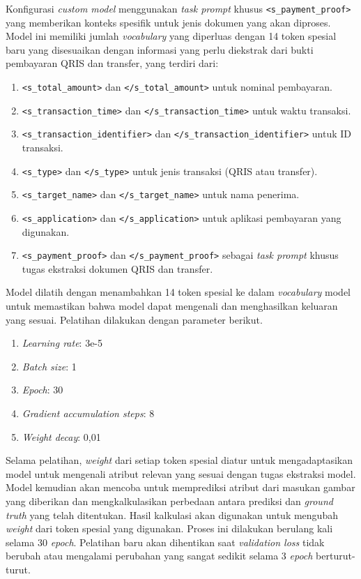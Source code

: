Konfigurasi \emph{custom model} menggunakan \emph{task prompt} khusus \texttt{<s\_payment\_proof>} yang memberikan konteks spesifik untuk jenis dokumen yang akan diproses. Model ini memiliki jumlah \emph{vocabulary} yang diperluas dengan 14 token spesial baru yang disesuaikan dengan informasi yang perlu diekstrak dari bukti pembayaran QRIS dan transfer, yang terdiri dari:
\begin{enumerate}
    \item \texttt{<s\_total\_amount>} dan \texttt{</s\_total\_amount>} untuk nominal pembayaran.
    \item \texttt{<s\_transaction\_time>} dan \texttt{</s\_transaction\_time>} untuk waktu transaksi.
    \item \texttt{<s\_transaction\_identifier>} dan \texttt{</s\_transaction\_identifier>} untuk ID transaksi.
    \item \texttt{<s\_type>} dan \texttt{</s\_type>} untuk jenis transaksi (QRIS atau transfer).
    \item \texttt{<s\_target\_name>} dan \texttt{</s\_target\_name>} untuk nama penerima.
    \item \texttt{<s\_application>} dan \texttt{</s\_application>} untuk aplikasi pembayaran yang digunakan.
    \item \texttt{<s\_payment\_proof>} dan \texttt{</s\_payment\_proof>} sebagai \emph{task prompt} khusus tugas ekstraksi dokumen QRIS dan transfer.
\end{enumerate}

Model dilatih dengan menambahkan 14 token spesial ke dalam \emph{vocabulary} model untuk memastikan bahwa model dapat mengenali dan menghasilkan keluaran yang sesuai. Pelatihan dilakukan dengan parameter berikut.
\begin{enumerate}
\item \emph{Learning rate}: 3e-5
\item \emph{Batch size}: 1
\item \emph{Epoch}: 30
\item \emph{Gradient accumulation steps}: 8
\item \emph{Weight decay}: 0,01
\end{enumerate}

Selama pelatihan, \emph{weight} dari setiap token spesial diatur untuk mengadaptasikan model untuk mengenali atribut relevan yang sesuai dengan tugas ekstraksi model. Model kemudian akan mencoba untuk memprediksi atribut dari masukan gambar yang diberikan dan mengkalkulasikan perbedaan antara prediksi dan \emph{ground truth} yang telah ditentukan. Hasil kalkulasi akan digunakan untuk mengubah \emph{weight} dari token spesial yang digunakan. Proses ini dilakukan berulang kali selama 30 \emph{epoch}. Pelatihan baru akan dihentikan saat \emph{validation loss} tidak berubah atau mengalami perubahan yang sangat sedikit selama 3 \emph{epoch} berturut-turut.

